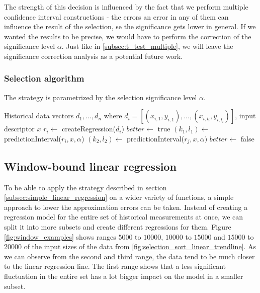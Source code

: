 The strength of this decision is influenced by the fact that we perform multiple confidence interval constructions - the errors an error in any of them can influence the result of the selection, se the significance gets lower in general. If we wanted the results to be precise, we would have to perform the correction of the significance level $\alpha$. Just like in \ref{subsec:t_test_multiple}, we will leave the significance correction analysis as a potential future work.

\subsubsection{Selection algorithm}

The strategy is parametrized by the selection significance level $\alpha$.

\begin{algorithmic}[1] %
	\INPUT Historical data vectors $d_1,...,d_n$ where $d_i = [(x_{i,1}, y_{i,1}),...,(x_{i,l_i}, y_{i,l_i})]$, input descriptor $x$
	\State $r_i \gets$ createRegression($d_i$) 
	\EndFor
	\State $better \gets$ true
	\State $(k_1, l_1) \gets$ predictionInterval($r_i, x, \alpha$)
	\State $(k_2, l_2) \gets$ predictionInterval($r_j, x, \alpha)$
	\State $better \gets$ false
	\EndIf
	\EndFor
	\State {}
	\EndIf
	\EndFor
	\State {}
\end{algorithmic}

\subsection{Window-bound linear regression}
\label{subsec:window_bound_regression}

To be able to apply the strategy described in section \ref{subsec:simple_linear_regression} on a wider variety of functions, a simple approach to lower the approximation errors can be taken. Instead of creating a regression model for the entire set of historical measurements at once, we can split it into more subsets and create different regressions for them. Figure \ref{fig:window_examples} shows ranges $5000$ to $10000$, $10000$ to $15000$ and $15000$ to $20000$ of the input sizes of the data from \ref{fig:selection_sort_linear_trendline}. As we can observe from the second and third range, the data tend to be much closer to the linear regression line. The first range shows that a less significant fluctuation in the entire set has a lot bigger impact on the model in a smaller subset.

